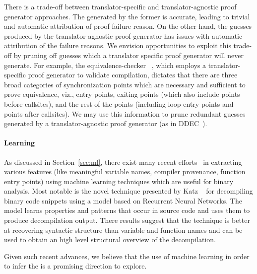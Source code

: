 There is a trade-off between translator-specific and translator-agnostic proof generator approaches. The \syncps generated by the former is accurate, leading to trivial and automatic attribution of proof failure reason. On the other hand, the \syncp guesses produced by the  translator-agnostic proof generator has issues with automatic attribution  of the failure reasons. We envision opportunities to exploit this trade-off by pruning off \syncp  guesses which a translator specific proof generator will never generate. For example, the equivalence-checker ~\cite{TheoSAS19}, which employs a translator-specific proof generator  to validate compilation,  dictates that there are three broad categories of synchronization points which are necessary and sufficient to prove equivalence, viz., 
entry points, exiting points (which also include points before callsites), and the rest of the points (including loop entry points and points after callsites). We may use this information to prune redundant \syncp guesses generated by a translator-agnostic  proof generator (as in DDEC~\cite{DDEC:OOPSLA:2013}).


\paragraph{\textbf{Learning \syncps}}

As discussed in Section~\ref{sec:ml}, there exist many recent efforts~\cite{Jaffe:2018ICPC,Rosenblum2007,Rosenblum:2008,Rosenblum:2010,Rosenblum:2011,Bao:2014,Shin:2015} in extracting various features (like meaningful variable names, compiler provenance, function entry points) using machine learning techniques which are useful for binary analysis. Most notable is the novel technique presented by Katz \etal~\cite{katz2018rnn}  for decompiling binary code snippets using a model based on Recurrent Neural Networks. The model learns properties and patterns that occur in source code and uses them to produce decompilation output. There results suggest that the technique is better at recovering syntactic structure than variable and function names and can be used to obtain an high level structural  overview of the decompilation.
    
Given such recent advances, we believe that the use of machine learning in order to infer the \syncp is a promising direction to explore.
